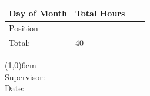 \documentclass{article}
\begin{document}
\vspace{1mm}
\begin{table}[htbp]
\begin{tabular}{ | C{2cm} | C{1cm} |  L{13.5cm} | N}
\hline
Day of Month & Total Hours & & \\ \hline
Position & & \\ \hline

Total: & 40 & \\ \hline
\end{tabular}
\label{tab:table}
\end{table}

\vspace{2.5cm}
\noindent \line(1,0){6cm} \\
Supervisor: \\
Date:
\end{document}
